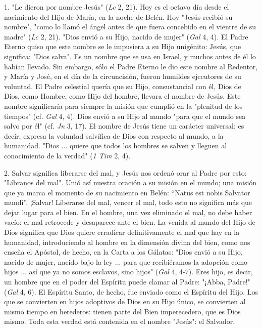 \begin{body}
1. "Le dieron por nombre Jesús" (\emph{Lc} 2, 21). Hoy es el octavo día desde el nacimiento del Hijo de María, en la noche de Belén. Hoy "Jesús recibió su nombre", "como lo llamó el ángel antes de que fuera concebido en el vientre de su madre" (\emph{Lc} 2, 21). "Dios envió a su Hijo, nacido de mujer" (\emph{Gal} 4, 4). El Padre Eterno quiso que este nombre se le impusiera a su Hijo unigénito: Jesús, que significa: "Dios salva". Es un nombre que se usa en Israel, y muchos antes de él lo habían llevado. Sin embargo, sólo el Padre Eterno le dio este nombre al Redentor, y María y José, en el día de la circuncisión, fueron humildes ejecutores de su voluntad. El Padre celestial quería que su Hijo, consustancial con él, Dios de Dios, como Hombre, como Hijo del hombre, llevara el nombre de Jesús. Este nombre significaría para siempre la misión que cumplió en la "plenitud de los tiempos" (cf. \emph{Gal} 4, 4). Dios envió a su Hijo al mundo "para que el mundo sea salvo por él" (cf. \emph{Jn} 3, 17). El nombre de Jesús tiene un carácter universal: es decir, expresa la voluntad salvífica de Dios con respecto al mundo, a la humanidad. "Dios ... quiere que todos los hombres se salven y lleguen al conocimiento de la verdad" (\emph{1 Tim} 2, 4).

2. Salvar significa liberarse del mal, y Jesús nos ordenó orar al Padre por esto: "Líbranos del mal". Unió así nuestra oración a su misión en el mundo; una misión que ya marca el momento de su nacimiento en Belén: ``Natus est nobis Salvator mundi''. ¡Salvar! Liberarse del mal, vencer el mal, todo esto no significa más que dejar lugar para el bien. En el hombre, una vez eliminado el mal, no debe haber vacío: el mal retrocede y desaparece ante el bien. La venida al mundo del Hijo de Dios significa que Dios quiere erradicar definitivamente el mal que hay en la humanidad, introduciendo al hombre en la dimensión divina del bien, como nos enseña el Apóstol, de hecho, en la Carta a los Gálatas: "Dios envió a su Hijo, nacido de mujer, nacido bajo la ley ... para que recibiéramos la adopción como hijos ... así que ya no somos esclavos, sino hijos" (\emph{Gal} 4, 4-7). Eres hijo, es decir, un hombre que en el poder del Espíritu puede clamar al Padre: "¡Abba, Padre!" (\emph{Gal} 4, 6). El Espíritu Santo, de hecho, fue enviado como el Espíritu del Hijo. Los que se convierten en hijos adoptivos de Dios en su Hijo único, se convierten al mismo tiempo en herederos: tienen parte del Bien imperecedero, que es Dios mismo. Toda esta verdad está contenida en el nombre "Jesús": el Salvador.


\end{body}
